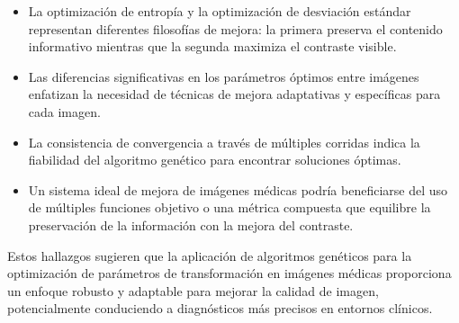 \begin{itemize}
    \item La optimización de entropía y la optimización de desviación estándar representan diferentes filosofías de mejora: la primera preserva el contenido informativo mientras que la segunda maximiza el contraste visible.

    \item Las diferencias significativas en los parámetros óptimos entre imágenes enfatizan la necesidad de técnicas de mejora adaptativas y específicas para cada imagen.

    \item La consistencia de convergencia a través de múltiples corridas indica la fiabilidad del algoritmo genético para encontrar soluciones óptimas.

    \item Un sistema ideal de mejora de imágenes médicas podría beneficiarse del uso de múltiples funciones objetivo o una métrica compuesta que equilibre la preservación de la información con la mejora del contraste.
\end{itemize}

Estos hallazgos sugieren que la aplicación de algoritmos genéticos para la optimización de parámetros de transformación en imágenes médicas proporciona un enfoque robusto y adaptable para mejorar la calidad de imagen, potencialmente conduciendo a diagnósticos más precisos en entornos clínicos.
